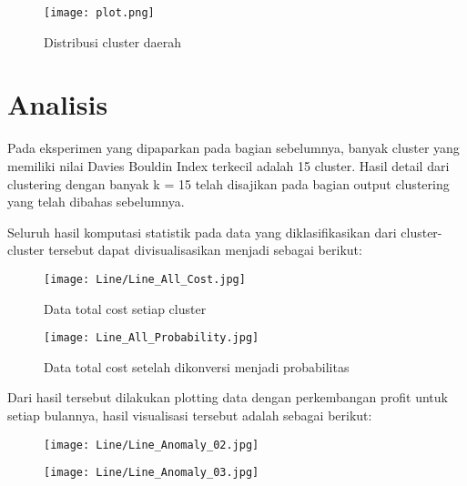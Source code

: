 \documentclass{article}
\begin{document}
\begin{figure}[H]
	\texttt{[image: plot.png]}
	\caption{Distribusi cluster daerah}
\end{figure}

\section{Analisis}

Pada eksperimen yang dipaparkan pada bagian sebelumnya, banyak cluster yang memiliki nilai Davies Bouldin Index terkecil adalah 15 cluster. Hasil detail dari clustering dengan banyak k = 15 telah disajikan pada bagian output clustering yang telah dibahas sebelumnya.

Seluruh hasil komputasi statistik pada data yang diklasifikasikan dari cluster-cluster tersebut dapat divisualisasikan menjadi sebagai berikut:

\begin{figure}[H]
	\centering
	\texttt{[image: Line/Line\_All\_Cost.jpg]}
	\caption{Data total cost setiap cluster}
\end{figure}

\begin{figure}[H]
	\centering
	\texttt{[image: Line\_All\_Probability.jpg]}
	\caption{Data total cost setelah dikonversi menjadi probabilitas}
\end{figure}

Dari hasil tersebut dilakukan plotting data dengan perkembangan profit  untuk setiap bulannya, hasil visualisasi tersebut adalah sebagai berikut:

\begin{figure}[H]
	\centering
	\begin{minipage}{.5\textwidth}
		\centering
		\texttt{[image: Line/Line\_Anomaly\_02.jpg]}
	\end{minipage}%
	\begin{minipage}{.5\textwidth}
		\centering
		\texttt{[image: Line/Line\_Anomaly\_03.jpg]}
	\end{minipage}%
\end{figure}
\end{document}
